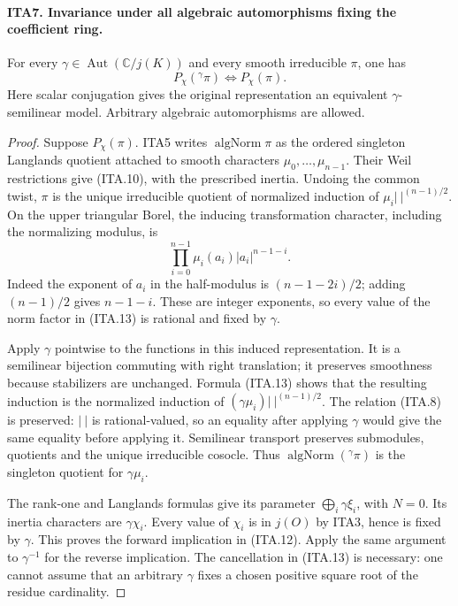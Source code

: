 \documentclass[11pt,a4paper]{article}
\numberwithin{equation}{section}
\theoremstyle{remark}\newtheorem{remark}[theorem]{Remark}
\begin{document}
\paragraph{ITA7. Invariance under all algebraic automorphisms fixing the coefficient ring.}
\label{claim:ITA7}
For every $\gamma\in\operatorname{Aut}(\mathbb C/j(K))$
and every smooth irreducible $\pi$, one has
\[
                        P_\chi({}^{\gamma}\pi)
                              \Longleftrightarrow P_\chi(\pi).
                                                               \tag{ITA.12}
\]
Here scalar conjugation gives the original representation an
equivalent $\gamma$-semilinear model.  Arbitrary algebraic
automorphisms are allowed.
\begin{proof}
Suppose $P_\chi(\pi)$.  ITA5 writes
$\operatorname{algNorm}\pi$ as the ordered singleton
Langlands quotient attached to smooth characters
$\mu_0,\ldots,\mu_{n-1}$.  Their Weil restrictions
give (ITA.10), with the prescribed inertia.
Undoing the common twist, $\pi$ is the unique irreducible
quotient of normalized induction of
$\mu_i|\ |^{(n-1)/2}$.  On the upper triangular Borel,
the inducing transformation character, including the
normalizing modulus, is
\[
       \prod_{i=0}^{n-1}\mu_i(a_i)|a_i|^{n-1-i}.
                                                               \tag{ITA.13}
\]
Indeed the exponent of $a_i$ in the half-modulus is
$(n-1-2i)/2$; adding $(n-1)/2$ gives $n-1-i$.
These are integer exponents, so every value of the norm
factor in (ITA.13) is rational and fixed by $\gamma$.

Apply $\gamma$ pointwise to the functions in this induced
representation.  It is a semilinear bijection commuting
with right translation; it preserves smoothness because
stabilizers are unchanged.  Formula (ITA.13) shows that
the resulting induction is the normalized induction of
$(\gamma\mu_i)|\ |^{(n-1)/2}$.  The relation (ITA.8)
is preserved: $|\ |$ is rational-valued, so an equality
after applying $\gamma$ would give the same equality
before applying it.  Semilinear transport preserves
submodules, quotients and the unique irreducible cosocle.
Thus $\operatorname{algNorm}({}^{\gamma}\pi)$ is the
singleton quotient for $\gamma\mu_i$.

The rank-one and Langlands formulas give its parameter
$\bigoplus_i\gamma\xi_i$, with $N=0$.  Its inertia
characters are $\gamma\chi_i$.  Every value of $\chi_i$
is in $j(O)$ by ITA3, hence is fixed by $\gamma$.
This proves the forward implication in (ITA.12).
Apply the same argument to $\gamma^{-1}$ for the reverse
implication.  The cancellation in (ITA.13) is necessary:
one cannot assume that an arbitrary $\gamma$ fixes a
chosen positive square root of the residue cardinality.
\end{proof}
\end{document}
